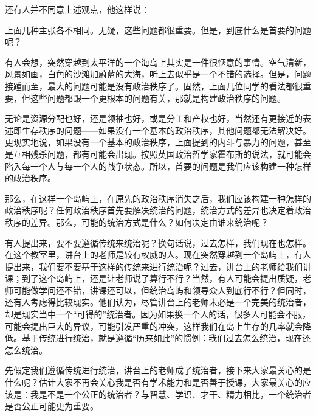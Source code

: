 
还有人并不同意上述观点，他这样说：


上面几种主张各不相同。无疑，这些问题都很重要。但是，到底什么是首要的问题呢？

有人会想，突然穿越到太平洋的一个海岛上其实是一件很惬意的事情。空气清新，风景如画，白色的沙滩加蔚蓝的大海，听上去似乎是一个不错的选择。但是，问题接踵而至，最大的问题可能是没有政治秩序了。固然，上面几位同学的看法都很重要，但这些问题都跟一个更根本的问题有关，那就是构建政治秩序的问题。

无论是资源分配也好，还是领袖也好，或是分工和产权也好，当然还有更接近的表述即生存秩序的问题——如果没有一个基本的政治秩序，其他问题都无法解决好。更现实地说，如果没有一个基本的政治秩序，上面提到的内斗与暴力的问题，甚至是互相残杀问题，都有可能会出现。按照英国政治哲学家霍布斯的说法，就可能会陷入每一个人与每一个人的战争状态。所以，首要的问题是我们应该构建一种怎样的政治秩序。

那么，在这样一个岛屿上，在原先的政治秩序消失之后，我们应该构建一种怎样的政治秩序呢？任何政治秩序首先要解决统治的问题，统治方式的差异也决定着政治秩序的差异。那么，可能的统治方式是什么？如何决定由谁来统治呢？

有人提出来，要不要遵循传统来统治呢？换句话说，过去怎样，我们现在也怎样。在这个教室里，讲台上的老师是较有权威的人。现在突然穿越到一个岛屿上，有人提出来，我们要不要基于这样的传统来进行统治呢？过去，讲台上的老师给我们讲课；到了这个岛屿上，还是让老师说了算行不行？当然，有人可能会提出质疑，老师可能做学问还不错，讲课还可以，但统治岛屿和领导众人到底行不行？但同时，还有人考虑得比较现实。他们认为，尽管讲台上的老师未必是一个完美的统治者，却是现实当中一个“可得的”统治者。因为如果换一个人的话，很多人可能会不服，可能会提出巨大的异议，可能引发严重的冲突，这样我们在岛上生存的几率就会降低。基于传统进行统治，就是遵循“历来如此”的惯例：我们过去怎么统治，现在还怎么统治。

先假定我们遵循传统进行统治，讲台上的老师成了统治者，接下来大家最关心的是什么呢？估计大家不再会关心我是否有学术能力和是否善于授课，大家最关心的应该是：我是不是一个公正的统治者？与智慧、学识、才干、精力相比，一个统治者是否公正可能更为重要。


